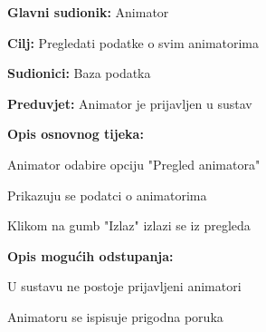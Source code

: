 					\noindent {}
					\begin{packed_item}
					
						\item \textbf{Glavni sudionik: }Animator
						\item  \textbf{Cilj:} Pregledati podatke o svim animatorima
						\item  \textbf{Sudionici:} Baza podatka
						\item  \textbf{Preduvjet:} Animator je prijavljen u sustav
						\item  \textbf{Opis osnovnog tijeka:}
					
						\item[] \begin{packed_enum}
							
							\item Animator odabire opciju "Pregled animatora"
							\item Prikazuju se podatci o animatorima
							\item Klikom na gumb "Izlaz" izlazi se iz pregleda
					\end{packed_enum}
					
					\item  \textbf{Opis mogućih odstupanja:}
					
					\item[] \begin{packed_item}
						
						\item[2.a] U sustavu ne postoje prijavljeni animatori
						\item[] \begin{packed_enum}
							
							\item Animatoru se ispisuje prigodna poruka
							
						\end{packed_enum}
						
						\end{packed_item}
					\end{packed_item}
			
